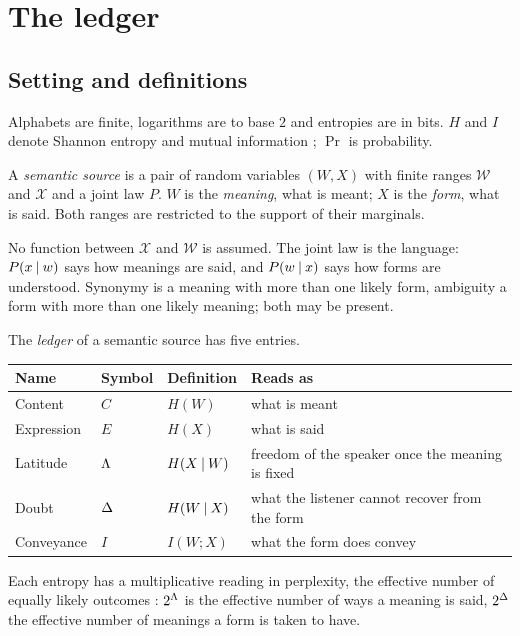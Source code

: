\section{The ledger}\label{sec:ledger}
\subsection{Setting and definitions}
Alphabets are finite, logarithms are to base $2$ and entropies are in bits. $H$ and $I$ denote Shannon entropy and mutual information \citep{cover2006}; $\Pr$ is probability.

\begin{definition}\label{def:source}
A \emph{semantic source} is a pair of random variables $(W,X)$ with finite ranges $\mathcal W$ and $\mathcal X$ and a joint law $P$. $W$ is the \emph{meaning}, what is meant; $X$ is the \emph{form}, what is said.
Both ranges are restricted to the support of their marginals.
\end{definition}
No function between $\mathcal X$ and $\mathcal W$ is assumed. The joint law is the language: $P(x\mathbin{\vert} w)$ says how meanings are said, and $P(w\mathbin{\vert} x)$ says how forms are understood.
Synonymy is a meaning with more than one likely form, ambiguity a form with more than one likely meaning; both may be present.

\begin{definition}[Ledger]\label{def:ledger}
The \emph{ledger} of a semantic source has five entries.
\begin{center}\small
\begin{tabular}{@{}l l l l@{}}
\toprule
Name & Symbol & Definition & Reads as \\
\midrule
Content & $C$ & $H(W)$ & what is meant \\
Expression & $E$ & $H(X)$ & what is said \\
Latitude & $\Lambda$ & $H(X\mathbin{\vert} W)$ & freedom of the speaker once the meaning is fixed \\
Doubt & $\Delta$ & $H(W\mathbin{\vert} X)$ & what the listener cannot recover from the form \\
Conveyance & $I$ & $I(W;X)$ & what the form does convey \\
\bottomrule
\end{tabular}
\end{center}
\end{definition}
Each entropy has a multiplicative reading in perplexity, the effective number of equally likely outcomes \citep{jelinek1977,hill1973}: $2^{\Lambda}$ is the effective number of ways a meaning is said, $2^{\Delta}$ the effective number of meanings a form is taken to have.

